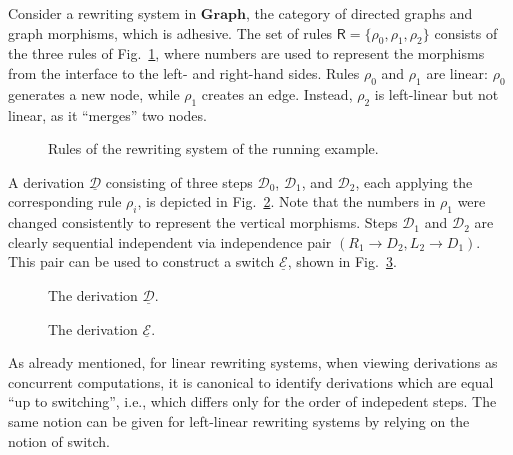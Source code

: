 \documentclass[a4paper,UKenglish,cleveref,pdftex,thm-restate,numberwithinsect,anonymous]{lipics}
\newcommand{\cat}[1]{\ensuremath{\mathbf{#1}}}
\def\R{\mathsf{R}}
\newcommand{\dder}[1]{\mathscr{#1}}
\newcommand{\der}[1]{\underline{\dder{#1}}}
\begin{document}
\begin{example}
  \label{ex:seq-ind}
  Consider a rewriting system in $\cat{Graph}$, the category of
  directed graphs and graph morphisms, which is adhesive. The set of
  rules $\R = \{ \rho_0, \rho_1, \rho_2\}$ consists of the three rules
  of Fig.~\ref{fi:rules}, where numbers are used to represent
  the morphisms from the interface to the left- and right-hand
  sides. Rules $\rho_0$ and $\rho_1$ are linear: $\rho_0$ generates a
  new node, while $\rho_1$ creates an edge. Instead, $\rho_2$ is
  left-linear but not linear, as it ``merges'' two nodes.


  \begin{figure}
    
    
    \caption{Rules of the rewriting system of the running example.}
    \label{fi:rules}
  \end{figure}
  
  A derivation $\der{D}$ consisting of three steps $\dder{D}_0$,
  $\dder{D}_1$, and $\dder{D}_2$, each applying the corresponding rule
  $\rho_i$, is depicted in Fig.~\ref{fi:derD}. Note that the numbers in $\rho_1$
  were changed consistently to represent the vertical morphisms.
  Steps $\dder{D}_1$ and $\dder{D}_2$ are clearly sequential
  independent via independence pair $(R_1 \to D_2, L_2 \to D_1)$.
  This pair can be used to construct a switch $\der{E}$, shown
  in Fig.~\ref{fi:derE}.
  
  \begin{figure}
    
    \caption{The derivation $\der{D}$.}
    \label{fi:derD}
  \end{figure}

  
  \begin{figure}
    
    \caption{The derivation $\der{E}$.}
    \label{fi:derE}
  \end{figure}
\end{example}


As already mentioned, for linear rewriting systems, when viewing
derivations as concurrent computations, it is canonical to identify
derivations which are equal ``up to switching'', i.e., which differs
only for the order of indepedent steps. The same notion can be given
for left-linear rewriting systems by relying on the notion of switch.
\end{document}
